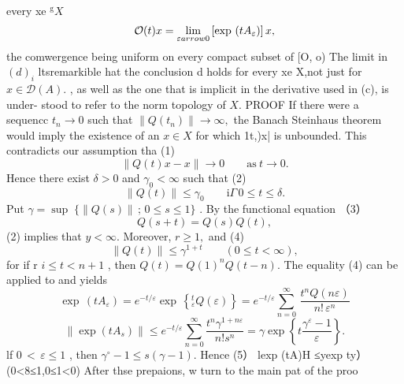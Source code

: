 every xe $^{\mathrm{g}}X$ $$ {\cal O}(t)x=\operatorname*{lim}_{\varepsilon arrow0}\left[\exp\,\,(t A_{\varepsilon})\right]x, $$ the comwergence being uniform on every compact subset of [O, o) The limit in $(d)_{i}$ ltsremarkible hat the conclusion d holds for every xe X,not just for $x\in{\mathcal{D}}(A).$ , as well as the one that is implicit in the derivative used in (c), is under- stood to refer to the norm topology of $X.$ PROOF If there were a sequencc $t_{n}\to0$ such that $\|Q(t_{n})\|\to\infty,$ the Banach Steinhaus theorem would imply the existence of an $x\in X$ for which { 1t,)x|} is unbounded. This contradicts our assumption tha (1) $$ \|Q(t)x-x\|\to0\qquad{\mathrm{as~}}t\to0. $$ Hence there exist $\delta>0$ and $\gamma_{0}<\infty$ such that (2) $$ \|Q(t)\|\le\gamma_{0}\qquad\mathrm{i}\Gamma\,0\le t\le\delta. $$ Put $\gamma=\operatorname*{sup}\;\{\|Q(s)\|\,;\,0\leq s\leq1\}$ . By the functional equation （3） $$ Q(s+t)=Q(s)Q(t), $$ (2) implies that $y<\infty.$ Moreover, $r\geq1,$ and (4) $$ \|Q(t)\|\leq\gamma^{1+t}\qquad(0\leq t<\infty), $$ for if r $i\leq t<n+1$ , then $Q(t)=Q(1)^{n}Q(t-n).$ The equality (4) can be applied to and yields $$ \exp\,\left(t A_{\varepsilon}\right)=e^{-t/\varepsilon}\exp\,\left\{_{\varepsilon}^{t}Q(\varepsilon)\right\}=e^{-t/\varepsilon}\sum_{n=0}^{\infty}\,\frac{t^{n}Q(n\varepsilon)}{n!\,\varepsilon^{n}} $$ $$ \left\|\exp\left(t A_{s}\right)\right\|\leq e^{-t/\varepsilon}\sum_{n=0}^{\infty}\frac{t^{n}\gamma^{1+n\varepsilon}}{n!s^{n}}=\gamma\exp\left\{t\frac{\gamma^{\varepsilon}-1}{\varepsilon}\right\}. $$ lf $\scriptstyle0\,<\,\varepsilon\leq1$ , then $\gamma^{\circ}-1\le s(\gamma-1).$ Hence (5） lexp (tA)H ≤yexp ty） (0<8≤1,0≤1<0) After thse prepaions, w turn to the main pat of the proo